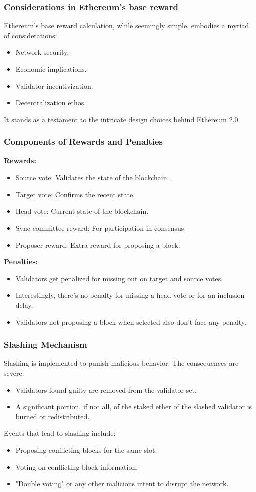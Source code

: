\documentclass{beamer}
\begin{document}
\begin{frame}
    \frametitle{Considerations in Ethereum's base reward}
    Ethereum's base reward calculation, while seemingly simple, embodies a myriad of considerations:
    \begin{itemize}
        \item Network security.
        \item Economic implications.
        \item Validator incentivization.
        \item Decentralization ethos.
    \end{itemize}
    It stands as a testament to the intricate design choices behind Ethereum 2.0.
\end{frame}
\begin{frame}
    \frametitle{Components of Rewards and Penalties}
    \textbf{Rewards:}
    \begin{itemize}
        \item Source vote: Validates the state of the blockchain.
        \item Target vote: Confirms the recent state.
        \item Head vote: Current state of the blockchain.
        \item Sync committee reward: For participation in consensus.
        \item Proposer reward: Extra reward for proposing a block.
    \end{itemize}
    \textbf{Penalties:}
    \begin{itemize}
        \item Validators get penalized for missing out on target and source votes.
        \item Interestingly, there's no penalty for missing a head vote or for an inclusion delay.
        \item Validators not proposing a block when selected also don't face any penalty.
    \end{itemize}
\end{frame}

\begin{frame}
    \frametitle{Slashing Mechanism}
    Slashing is implemented to punish malicious behavior. The consequences are severe:
    \begin{itemize}
        \item Validators found guilty are removed from the validator set.
        \item A significant portion, if not all, of the staked ether of the slashed validator is burned or redistributed.
    \end{itemize}
    Events that lead to slashing include:
    \begin{itemize}
        \item Proposing conflicting blocks for the same slot.
        \item Voting on conflicting block information.
        \item "Double voting" or any other malicious intent to disrupt the network.
    \end{itemize}
\end{frame}
\end{document}
